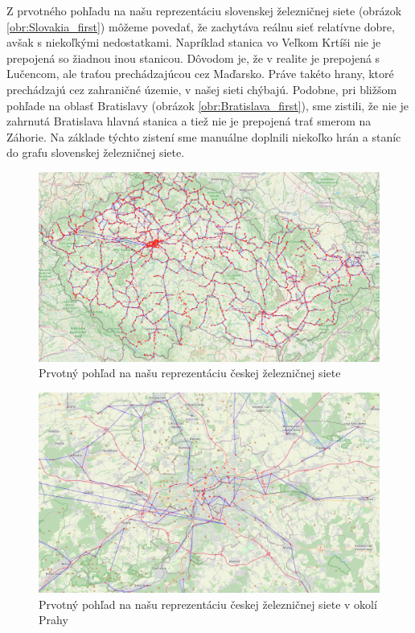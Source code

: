 \documentclass[main.tex]{subfiles}
\begin{document}
Z prvotného pohľadu na našu reprezentáciu slovenskej železničnej siete (obrázok \ref{obr:Slovakia_first}) môžeme povedať, že zachytáva reálnu sieť relatívne dobre, avšak s niekoľkými nedostatkami. Napríklad stanica vo Veľkom Krtíši nie je prepojená so žiadnou inou stanicou. Dôvodom je, že v realite je prepojená s Lučencom, ale traťou prechádzajúcou cez Maďarsko. Práve takéto hrany, ktoré prechádzajú cez zahraničné územie, v našej sieti chýbajú. Podobne, pri bližšom pohľade na oblasť Bratislavy (obrázok \ref{obr:Bratislava_first}), sme zistili, že nie je zahrnutá Bratislava hlavná stanica a tiež nie je prepojená trať smerom na Záhorie. Na základe týchto zistení sme manuálne doplnili niekoľko hrán a staníc do grafu slovenskej železničnej siete.

\begin{figure}
\centerline{\includegraphics[width=1\textwidth]{images/first_attempt_czechia.png}}
\caption{Prvotný pohľad na našu reprezentáciu českej železničnej siete}
\label{obr:Czechia_first}
\end{figure}

\begin{figure}
\centerline{\includegraphics[width=1\textwidth]{images/first_attempt_praha.png}}
\caption{Prvotný pohľad na našu reprezentáciu českej železničnej siete v okolí Prahy}
\label{obr:Praha_first}
\end{figure}
\end{document}
